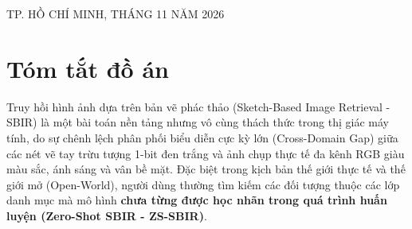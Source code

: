 \documentclass[12pt,a4paper]{report}
\begin{document}
\begin{titlepage}
\begin{center}
        \vfill
        {\large TP. HỒ CHÍ MINH, THÁNG 11 NĂM 2026}
    \end{center}
\end{titlepage}

\newpage
{}
\tableofcontents
\newpage
\listoftables
\newpage
\listoffigures
\newpage

\chapter*{Tóm tắt đồ án}

Truy hồi hình ảnh dựa trên bản vẽ phác thảo (Sketch-Based Image Retrieval - SBIR) là một bài toán nền tảng nhưng vô cùng thách thức trong thị giác máy tính, do sự chênh lệch phân phối biểu diễn cực kỳ lớn (Cross-Domain Gap) giữa các nét vẽ tay trừu tượng 1-bit đen trắng và ảnh chụp thực tế đa kênh RGB giàu màu sắc, ánh sáng và vân bề mặt. Đặc biệt trong kịch bản thế giới thực tế và thế giới mở (Open-World), người dùng thường tìm kiếm các đối tượng thuộc các lớp danh mục mà mô hình \textbf{chưa từng được học nhãn trong quá trình huấn luyện (Zero-Shot SBIR - ZS-SBIR)}.
\end{document}

